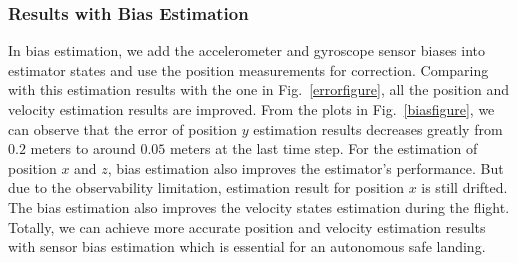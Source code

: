 \documentclass[letterpaper, 10 pt, conference]{ieeeconf}  %
\begin{document}
\subsubsection{Results with Bias Estimation }
In bias estimation, we add the accelerometer and gyroscope sensor biases into estimator states and use the position measurements for correction. Comparing with this estimation results with the one in Fig.~\ref{errorfigure}, all the position and velocity estimation results are improved. From the plots in Fig.~\ref{biasfigure}, we can observe that the error of position $y$ estimation results decreases greatly from $0.2$ meters to around $0.05$ meters at the last time step. For the estimation of position $x$ and $z$, bias estimation also improves the estimator's performance. But due to the observability limitation, estimation result for position $x$ is still drifted. The bias estimation also improves the velocity states estimation during the flight. Totally, we can achieve more accurate position and velocity estimation results with sensor bias estimation which is essential for an autonomous safe landing.   
\end{document}
